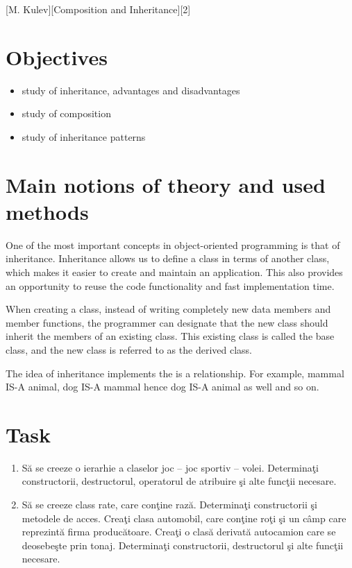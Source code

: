 \documentclass{article}
\begin{document}
	\def \reportSubj {Composition and Inheritance}
	[M. Kulev][\reportSubj][2]

	\section{Objectives}
		\begin{itemize}
			\item study of inheritance, advantages and disadvantages
			\item study of composition
			\item study of inheritance patterns
		\end{itemize}

	\section{Main notions of theory and used methods}
		\par One of the most important concepts in object-oriented programming is that of inheritance. Inheritance allows us to define a class in terms of another class, which makes it easier to create and maintain an application. This also provides an opportunity to reuse the code functionality and fast implementation time.

		\par When creating a class, instead of writing completely new data members and member functions, the programmer can designate that the new class should inherit the members of an existing class. This existing class is called the base class, and the new class is referred to as the derived class.

		\par The idea of inheritance implements the is a relationship. For example, mammal IS-A animal, dog IS-A mammal hence dog IS-A animal as well and so on.

	\section{Task}
\begin{enumerate}
			\item Să se creeze o ierarhie a claselor joc – joc sportiv – volei. Determinaţi constructorii, destructorul, operatorul de atribuire şi alte funcţii necesare.
			\item Să se creeze class rate,  care conţine rază. Determinaţi constructorii şi metodele de acces. Creaţi clasa automobil, care conţine roţi şi un câmp care reprezintă firma producătoare. Creaţi o clasă derivată autocamion care se deosebeşte prin tonaj. Determinaţi constructorii, destructorul şi alte funcţii necesare.
		\end{enumerate}
\end{document}
